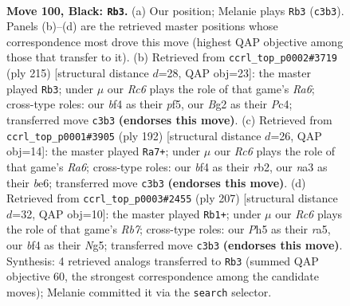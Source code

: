 \documentclass[11pt]{article}
\begin{document}
\clearpage

\begin{figure}[p]\centering
\begin{subfigure}{0.46\textwidth}\centering
\resizebox{\linewidth}{!}{%
\newchessgame
\chessboard[
  setfen={2n3K1/8/p3k3/P4p1p/5B2/N1r3P1/6b1/R7 b - - 11 100},
  showmover=false,
  pgfstyle=straightmove, color=movearrow, markmove={c3-b3}
]}
\caption{}
\end{subfigure}\hfill
\begin{subfigure}{0.46\textwidth}\centering
\resizebox{\linewidth}{!}{%
\newchessgame
\chessboard[
  setfen={8/6k1/5p2/4pP2/2p3P1/r1N5/3B4/5K2 b - - 71 108},
  showmover=false,
  pgfstyle=straightmove, color=movearrow, markmove={a3-b3}
]}
\caption{}
\end{subfigure}
\\[4pt]
\begin{subfigure}{0.46\textwidth}\centering
\resizebox{\linewidth}{!}{%
\newchessgame
\chessboard[
  setfen={8/4k3/R3b2p/5p2/7P/N3PPK1/1r6/8 w - - 31 97},
  showmover=false,
  pgfstyle=straightmove, color=movearrow, markmove={a6-a7}
]}
\caption{}
\end{subfigure}\hfill
\begin{subfigure}{0.46\textwidth}\centering
\resizebox{\linewidth}{!}{%
\newchessgame
\chessboard[
  setfen={8/6k1/6p1/R5n1/6Pp/4P2P/1r4B1/5K2 b - - 12 104},
  showmover=false,
  pgfstyle=straightmove, color=movearrow, markmove={b2-b1}
]}
\caption{}
\end{subfigure}
\caption{\textbf{Move 100, Black: \texttt{Rb3}.} (a) Our position; Melanie plays \texttt{Rb3} (\texttt{c3b3}). Panels (b)--(d) are the retrieved master positions whose correspondence most drove this move (highest QAP objective among those that transfer to it). (b) Retrieved from \texttt{ccrl\_top\_p0002\#3719} (ply 215) [structural distance $d$=28, QAP obj=23]: the master played \texttt{Rb3}; under $\mu$ our \emph{Rc6} plays the role of that game's \emph{Ra6}; cross-type roles: our \emph{b}f4 as their \emph{p}f5, our \emph{B}g2 as their \emph{P}c4; transferred move \texttt{c3b3} \textbf{(endorses this move)}. (c) Retrieved from \texttt{ccrl\_top\_p0001\#3905} (ply 192) [structural distance $d$=26, QAP obj=14]: the master played \texttt{Ra7+}; under $\mu$ our \emph{Rc6} plays the role of that game's \emph{Ra6}; cross-type roles: our \emph{b}f4 as their \emph{r}b2, our \emph{n}a3 as their \emph{b}e6; transferred move \texttt{c3b3} \textbf{(endorses this move)}. (d) Retrieved from \texttt{ccrl\_top\_p0003\#2455} (ply 207) [structural distance $d$=32, QAP obj=10]: the master played \texttt{Rb1+}; under $\mu$ our \emph{Rc6} plays the role of that game's \emph{Rb7}; cross-type roles: our \emph{P}h5 as their \emph{r}a5, our \emph{b}f4 as their \emph{N}g5; transferred move \texttt{c3b3} \textbf{(endorses this move)}. Synthesis: 4 retrieved analogs transferred to \texttt{Rb3} (summed QAP objective 60, the strongest correspondence among the candidate moves); Melanie committed it via the \texttt{search} selector.}
\label{fig:thought-m199}
\end{figure}
\end{document}
